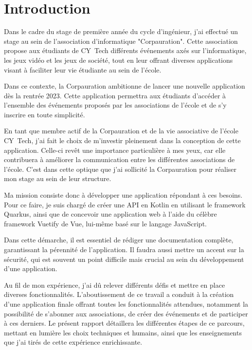 
\section{Introduction}

Dans le cadre du stage de première année du cycle d'ingénieur, j'ai effectué un stage au sein de l'association d'informatique "Corpauration". Cette association propose aux étudiants de CY~Tech différents événements axés sur l'informatique, les jeux vidéo et les jeux de société, tout en leur offrant diverses applications visant à faciliter leur vie étudiante au sein de l'école.

Dans ce contexte, la Corpauration ambitionne de lancer une nouvelle application dès la rentrée 2023. Cette application permettra aux étudiants d'accéder à l'ensemble des événements proposés par les associations de l'école et de s'y inscrire en toute simplicité.

En tant que membre actif de la Corpauration et de la vie associative de l'école CY~Tech, j'ai fait le choix de m'investir pleinement dans la conception de cette application. Celle-ci revêt une importance particulière à mes yeux, car elle contribuera à améliorer la communication entre les différentes associations de l'école. C'est dans cette optique que j'ai sollicité la Corpauration pour réaliser mon stage au sein de leur structure.

\medskip

Ma mission consiste donc à développer une application répondant à ces besoins. Pour ce faire, je suis chargé de créer une API en Kotlin en utilisant le framework Quarkus, ainsi que de concevoir une application web à l'aide du célèbre framework Vuetify de Vue, lui-même basé sur le langage JavaScript.

Dans cette démarche, il est essentiel de rédiger une documentation complète, garantissant la pérennité de l'application. Il faudra aussi mettre un accent sur la sécurité, qui est souvent un point difficile mais crucial au sein du développement d'une application.

\medskip

Au fil de mon expérience, j'ai dû relever différents défis et mettre en place diverses fonctionnalités. L'aboutissement de ce travail a conduit à la création d'une application finale offrant toutes les fonctionnalités attendues, notamment la possibilité de s'abonner aux associations, de créer des événements et de participer à ces derniers. Le présent rapport détaillera les différentes étapes de ce parcours, mettant en lumière les choix techniques et humains, ainsi que les enseignements que j'ai tirés de cette expérience enrichissante.

